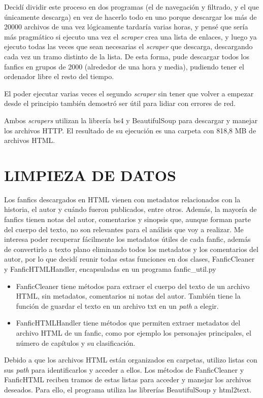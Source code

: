 \documentclass{pre-tfg}
\begin{document}
Decidí dividir este proceso en dos programas (el de navegación y filtrado, y el que únicamente descarga) en vez de hacerlo todo en uno porque descargar los más de 20000 archivos de una vez lógicamente tardaría varias horas, y pensé que sería más pragmático si ejecuto una vez el \textit{scraper} crea una lista de enlaces, y luego ya ejecuto todas las veces que sean necesarias el \textit{scraper} que descarga, descargando cada vez un tramo distinto de la lista. De esta forma, pude descargar todos los fanfics en grupos de 2000 (alrededor de una hora y media), pudiendo tener el ordenador libre el resto del tiempo.

El poder ejecutar varias veces el segundo \textit{scraper} sin tener que volver a empezar desde el principio también demostró ser útil para lidiar con errores de red.

Ambos \textit{scrapers} utilizan la librería bs4 y BeautifulSoup para descargar y manejar los archivos HTTP. El resultado de su ejecución es una carpeta con 818,8 MB de archivos HTML.

\section{LIMPIEZA DE DATOS}
Los fanfics descargados en HTML vienen con metadatos relacionados con la historia, el autor y cuándo fueron publicados, entre otros. Además, la mayoría de fanfics tienen notas del autor, comentarios y sinopsis que, aunque forman parte del cuerpo del texto, no son relevantes para el análisis que voy a realizar.
Me interesa poder recuperar fácilmente los metadatos útiles de cada fanfic, además de convertirlo a texto plano eliminando todos los metadatos y los comentarios del autor, por lo que decidí reunir todas estas funciones en dos clases, FanficCleaner y FanficHTMLHandler, encapsuladas en un programa fanfic\_util.py

\begin{itemize}
	\item FanficCleaner tiene métodos para extraer el cuerpo del texto de un archivo HTML, sin metadatos, comentarios ni notas del autor. También tiene la función de guardar el texto en un archivo txt en un \textit{path} a elegir.
	\item FanficHTMLHandler tiene métodos que permiten extraer metadatos del archivo HTML de un fanfic, como por ejemplo los personajes principales, el número de capítulos y su clasificación.
\end{itemize}

Debido a que los archivos HTML están organizados en carpetas, utilizo listas con sus \textit{path} para identificarlos y acceder a ellos. Los métodos de FanficCleaner y FanficHTML reciben tramos de estas listas para acceder y manejar los archivos deseados.
Para ello, el programa utiliza las librerías BeautifulSoup y html2text.
\end{document}
